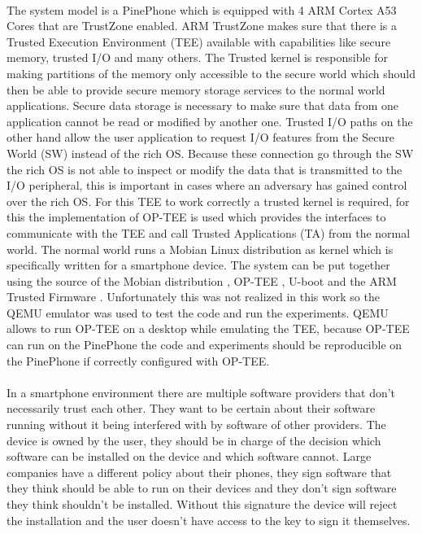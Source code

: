\documentclass{report}
\begin{document}
\paragraph*{}
The system model is a PinePhone which is equipped with 4 ARM Cortex A53 Cores that are TrustZone enabled. ARM TrustZone makes sure that there is a Trusted Execution Environment (TEE) available with capabilities like secure memory, trusted I/O and many others. The Trusted kernel is responsible for making partitions of the memory only accessible to the secure world which should then be able to provide secure memory storage services to the normal world applications. Secure data storage is necessary to make sure that data from one application cannot be read or modified by another one. Trusted I/O paths on the other hand allow the user application to request I/O features from the Secure World (SW) instead of the rich OS. Because these connection go through the SW the rich OS is not able to inspect or modify the data that is transmitted to the I/O peripheral, this is important in cases where an adversary has gained control over the rich OS. For this TEE to work correctly a trusted kernel is required, for this the implementation of OP-TEE is used which provides the interfaces to communicate with the TEE and call Trusted Applications (TA) from the normal world. The normal world runs a Mobian Linux distribution as kernel which is specifically written for a smartphone device. The system can be put together using the source of the Mobian distribution \cite{mobian}, OP-TEE \cite{OPTEEgit}, U-boot \cite{u-boot} and the ARM Trusted Firmware \cite{ARMfirmware}. Unfortunately this was not realized in this work so the QEMU emulator \cite{QEMU} was used to test the code and run the experiments. QEMU allows to run OP-TEE on a desktop while emulating the TEE, because OP-TEE can run on the PinePhone the code and experiments should be reproducible on the PinePhone if correctly configured with OP-TEE.

\paragraph*{}
In a smartphone environment there are multiple software providers that don't necessarily trust each other. They want to be certain about their software running without it being interfered with by software of other providers. The device is owned by the user, they should be in charge of the decision which software can be installed on the device and which software cannot. Large companies have a different policy about their phones, they sign software that they think should be able to run on their devices and they don't sign software they think shouldn't be installed. Without this signature the device will reject the installation and the user doesn't have access to the key to sign it themselves.
\end{document}
